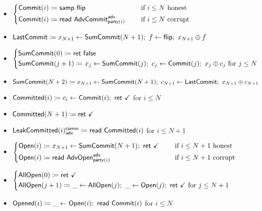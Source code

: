 \begin{itemize}
\item {\color{blue} $\begin{cases*} \Commit(i) \coloneqq \samp{\flip} & \hspace{10pt} \text{if $i \leq N$ honest} \\ \Commit(i) \coloneqq \read{\AdvCommit^\adv_{\party(i)}} & \hspace{10pt} \text{if $i \leq N$ corrupt} \end{cases*}$}
\item {\color{blue} $\mathsf{LastCommit} \coloneqq x_{N+1} \leftarrow \mathsf{SumCommit}(N+1); \ f \leftarrow \mathsf{flip}; \ x_{N+1} \oplus f$}
\item {\color{blue} $\begin{cases*} \SumCommit(0) \coloneqq \ret{\false} \\ \SumCommit(j+1) \coloneqq x_j \leftarrow \SumCommit(j); \ c_j \leftarrow \Commit(j); \ x_j \oplus c_j \text{ for $j \leq N$} \end{cases*}$}
\item {\color{blue} $\SumCommit(N+2) \coloneqq x_{N+1} \leftarrow \SumCommit(N+1); \ c_{N+1} \leftarrow \LastCommit; \ x_{N+1} \oplus c_{N+1}$}
\item {\color{magenta} $\mathsf{Committed}(i) \coloneqq c_i \leftarrow \mathsf{Commit}(i); \ \mathsf{ret} \ \checkmark$ for $i \leq N$}
\item {\color{magenta} $\mathsf{Committed}(N+1) \coloneqq \mathsf{ret} \ \checkmark$}
\item {\color{magenta} $\mathsf{LeakCommitted}(i)^{\mathsf{comm}}_{\mathsf{adv}} \coloneqq \mathsf{read} \ \mathsf{Committed}(i)$ for $i \leq N+1$}
\item {\color{teal} $\begin{cases*} \Open(i) \coloneqq x_{N+1} \leftarrow \SumCommit(N+1); \ \ret{\checkmark} & \hspace{10pt} \text{if $i \leq N+1$ honest} \\ \Open(i) \coloneqq \read{\AdvOpen^\adv_{\party(i)}} & \hspace{10pt} \text{if $i \leq N+1$ corrupt} \end{cases*}$}
\item {\color{teal} $\begin{cases*} \AllOpen(0) \coloneqq \ret{\checkmark} \\ \AllOpen(j+1) \coloneqq \_ \leftarrow \AllOpen(j); \ \_ \leftarrow \Open(j); \ \ret{\checkmark} \text{ for $j \leq N+1$} \end{cases*}$}
\item {\color{red} $\mathsf{Opened}(i) \coloneqq \_ \leftarrow \mathsf{Open}(i); \ \mathsf{read} \ \mathsf{Commit}(i)$ for $i \leq N$}

\end{itemize}
